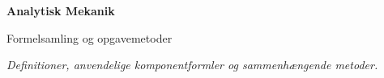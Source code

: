 \documentclass[11pt,a4paper,oneside]{article}
\begin{document}
{\huge\bfseries Analytisk Mekanik}\par\vspace{5pt}
{\Large\color{accent}Formelsamling og opgavemetoder}\par\medskip
\textit{Definitioner, anvendelige komponentformler og sammenhængende metoder.}
\vspace{5pt}\tableofcontents\clearpage








\end{document}

